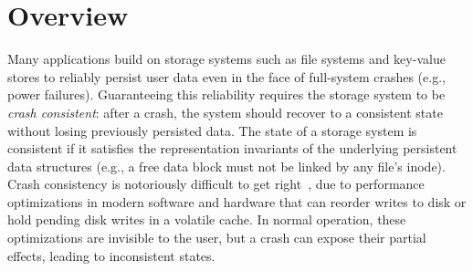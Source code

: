 \section{Overview}





Many applications build on storage systems
such as file systems and key-value stores
to reliably persist user data
even in the face of full-system crashes (e.g., power failures).
Guaranteeing this reliability requires the storage system to be \emph{crash consistent}:
after a crash, the system should recover to a consistent state without losing previously persisted data.
The state of a storage system is consistent if it satisfies the representation 
invariants of the underlying persistent data structures (e.g., a free data block must not be linked by any file's inode).
Crash consistency is notoriously difficult to get right~\cite{yang:explode,pillai:appcrash,zheng:torturing-db}, 
due to performance optimizations in modern software and hardware
that can reorder writes to disk
or hold pending disk writes in a volatile cache.
In normal operation, these optimizations are invisible to the user,
but a crash can expose their partial effects, leading to 
inconsistent states.

